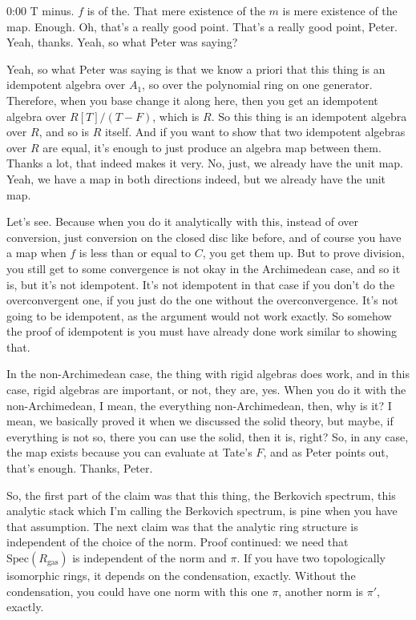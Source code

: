 \begin{unfinished}{0:00}
T minus. $f$ is of the. That mere existence of the $m$ is mere existence of the map. Enough. Oh, that's a really good point. That's a really good point, Peter. Yeah, thanks. Yeah, so what Peter was saying?

Yeah, so what Peter was saying is that we know a priori that this thing is an idempotent algebra over $A_1$, so over the polynomial ring on one generator. Therefore, when you base change it along here, then you get an idempotent algebra over $R[T]/(T-F)$, which is $R$. So this thing is an idempotent algebra over $R$, and so is $R$ itself. And if you want to show that two idempotent algebras over $R$ are equal, it's enough to just produce an algebra map between them. Thanks a lot, that indeed makes it very. No, just, we already have the unit map. Yeah, we have a map in both directions indeed, but we already have the unit map.

Let's see. Because when you do it analytically with this, instead of over conversion, just conversion on the closed disc like before, and of course you have a map when $f$ is less than or equal to $C$, you get them up. But to prove division, you still get to some convergence is not okay in the Archimedean case, and so it is, but it's not idempotent. It's not idempotent in that case if you don't do the overconvergent one, if you just do the one without the overconvergence. It's not going to be idempotent, as the argument would not work exactly. So somehow the proof of idempotent is you must have already done work similar to showing that.

In the non-Archimedean case, the thing with rigid algebras does work, and in this case, rigid algebras are important, or not, they are, yes. When you do it with the non-Archimedean, I mean, the everything non-Archimedean, then, why is it? I mean, we basically proved it when we discussed the solid theory, but maybe, if everything is not so, there you can use the solid, then it is, right? So, in any case, the map exists because you can evaluate at Tate's $F$, and as Peter points out, that's enough. Thanks, Peter.

So, the first part of the claim was that this thing, the Berkovich spectrum, this analytic stack which I'm calling the Berkovich spectrum, is pine when you have that assumption. The next claim was that the analytic ring structure is independent of the choice of the norm. Proof continued: we need that $\text{Spec}(R_{\text{gas}})$ is independent of the norm and $\pi$. If you have two topologically isomorphic rings, it depends on the condensation, exactly. Without the condensation, you could have one norm with this one $\pi$, another norm is $\pi'$, exactly.


\end{unfinished}
